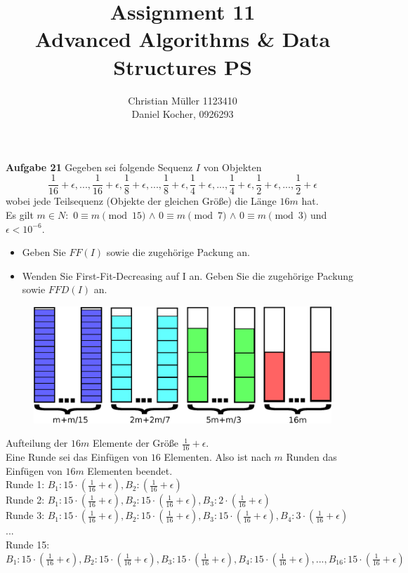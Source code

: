 \documentclass{article}
\begin{document}
\title{Assignment 11 \\ Advanced Algorithms \& Data Structures PS}%
\author{Christian Müller 1123410 \\ Daniel Kocher, 0926293}%
\maketitle

{\bfseries Aufgabe 21}%
Gegeben sei folgende Sequenz $I$ von Objekten
\begin{equation}
\frac{1}{16}+\epsilon,...,\frac{1}{16}+\epsilon,\frac{1}{8}+\epsilon,...,\frac{1}{8}+\epsilon,\frac{1}{4}+\epsilon,...,\frac{1}{4}+\epsilon,\frac{1}{2}+\epsilon,...,\frac{1}{2}+\epsilon
\end{equation}
wobei jede Teilsequenz (Objekte der gleichen Größe) die Länge $16m $ hat.\\ Es gilt $m\in N: $ $0 \equiv m \pmod{15}$ $\wedge$ $0 \equiv m \pmod{7}$ $\wedge$ $0 \equiv m \pmod{3}$ und $\epsilon < 10^{-6}$.
\begin{itemize}
	\item Geben Sie $FF(I)$ sowie die zugehörige Packung an.
	\item Wenden Sie First-Fit-Decreasing auf I an. Geben Sie die zugehörige Packung sowie $FFD(I)$ an.
\end{itemize}

\begin{figure}[H]
\begin{center}
	\includegraphics[scale=.5]{drawing}
\end{center}
\end{figure}
Aufteilung der $16m$ Elemente der Größe  $\frac{1}{16}+\epsilon$. \\
Eine Runde sei das Einfügen von $16$ Elementen. Also ist nach $m$ Runden das Einfügen von $16m$ Elementen beendet.\\

Runde 1: $B_{1}: 15\cdot(\frac{1}{16}+\epsilon), B_{2}:(\frac{1}{16}+\epsilon) $\\
Runde 2: $B_{1}: 15\cdot(\frac{1}{16}+\epsilon), B_{2}:15\cdot(\frac{1}{16}+\epsilon), B_{3}: 2\cdot(\frac{1}{16}+\epsilon) $\\
Runde 3: $B_{1}: 15\cdot(\frac{1}{16}+\epsilon), B_{2}:15\cdot(\frac{1}{16}+\epsilon), B_{3}: 15\cdot(\frac{1}{16}+\epsilon),B_{4}: 3\cdot(\frac{1}{16}+\epsilon)  $\\
...\\
Runde 15: $B_{1}: 15\cdot(\frac{1}{16}+\epsilon), B_{2}:15\cdot(\frac{1}{16}+\epsilon), B_{3}: 15\cdot(\frac{1}{16}+\epsilon),B_{4}: 15\cdot(\frac{1}{16}+\epsilon), ...,B_{16}: 15\cdot(\frac{1}{16}+\epsilon) $
\end{document}
